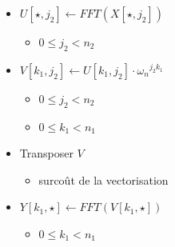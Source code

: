 \documentclass[xcolor={x11names,svgnames}]{beamer}
\newcommand{\red}[1]{{\color{red}#1}}
\begin{document}

\begin{frame}[fragile]
  \begin{overlayarea}{\textwidth}{2cm}
      
\end{overlayarea}

\begin{overlayarea}{\textwidth}{8cm}
  \begin{columns}[T]
    \begin{column}{6cm}
      \small 
      \begin{itemize}
      \item<2-> $U[\star, j_2] \gets FFT(X[\star, j_2])$
        \begin{itemize}
        \item $0 \leq j_2 < n_2$
        \end{itemize}

      \item<4-> $V[k_1, j_2] \gets U[k_1, j_2] \cdot {\omega_n}^{j_2 k_1}$
        \begin{itemize}
        \item $0 \leq j_2 < n_2$
        \item $0 \leq k_1 < n_1$ 
        \end{itemize}

      \item<7-> Transposer $V$
        \begin{itemize}
        \item \red{surcoût} de la vectorisation
        \end{itemize}
        
      \item<only@5-6> $Y[k_1, \star] \gets FFT(V[k_1, \star])$
        \begin{itemize}
        \item $0 \leq k_1 < n_1$
        \end{itemize}


\end{itemize}
\end{column}
\end{columns}
\end{overlayarea}
\end{frame}
\end{document}
